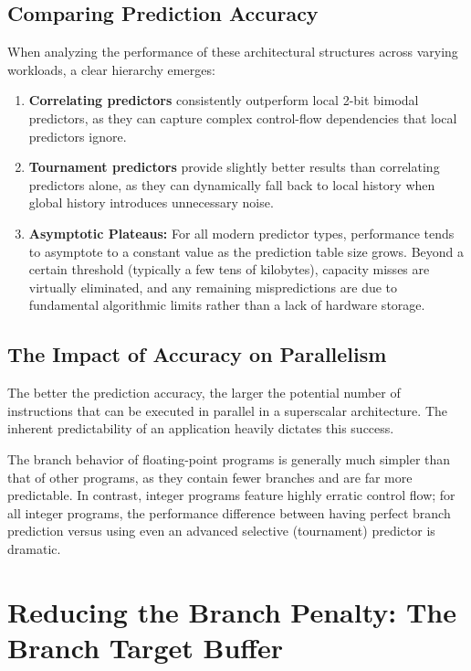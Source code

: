 \subsection{Comparing Prediction Accuracy}

When analyzing the performance of these architectural structures across varying workloads, a clear hierarchy emerges:
\begin{enumerate}
    \item \textbf{Correlating predictors} consistently outperform local 2-bit bimodal predictors, as they can capture complex control-flow dependencies that local predictors ignore.
    \item \textbf{Tournament predictors} provide slightly better results than correlating predictors alone, as they can dynamically fall back to local history when global history introduces unnecessary noise.
    \item \textbf{Asymptotic Plateaus:} For all modern predictor types, performance tends to asymptote to a constant value as the prediction table size grows. Beyond a certain threshold (typically a few tens of kilobytes), capacity misses are virtually eliminated, and any remaining mispredictions are due to fundamental algorithmic limits rather than a lack of hardware storage.
\end{enumerate}

\subsection{The Impact of Accuracy on Parallelism}

The better the prediction accuracy, the larger the potential number of instructions that can be executed in parallel in a superscalar architecture. The inherent predictability of an application heavily dictates this success. 

The branch behavior of floating-point programs is generally much simpler than that of other programs, as they contain fewer branches and are far more predictable. In contrast, integer programs feature highly erratic control flow; for all integer programs, the performance difference between having perfect branch prediction versus using even an advanced selective (tournament) predictor is dramatic.

\section{Reducing the Branch Penalty: The Branch Target Buffer}

